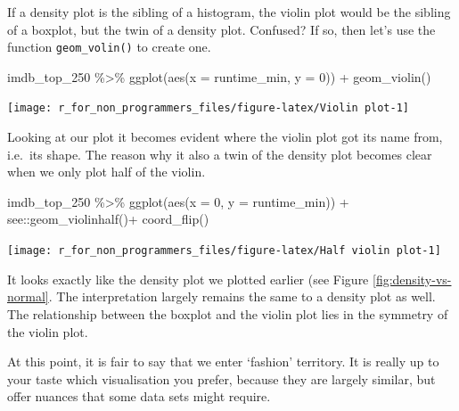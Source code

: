 \documentclass[
]{book}
\newenvironment{Shaded}{\begin{snugshade}}{\end{snugshade}}
\newcommand{\AttributeTok}[1]{\textcolor[rgb]{0.77,0.63,0.00}{#1}}
\newcommand{\DecValTok}[1]{\textcolor[rgb]{0.00,0.00,0.81}{#1}}
\newcommand{\FunctionTok}[1]{\textcolor[rgb]{0.00,0.00,0.00}{#1}}
\newcommand{\NormalTok}[1]{#1}
\newcommand{\SpecialCharTok}[1]{\textcolor[rgb]{0.00,0.00,0.00}{#1}}
\begin{document}
If a density plot is the sibling of a histogram, the violin plot would be the sibling of a boxplot, but the twin of a density plot. Confused? If so, then let's use the function \texttt{geom\_volin()} to create one.

\begin{Shaded}
\begin{Highlighting}[]
\NormalTok{imdb\_top\_250 }\SpecialCharTok{\%\textgreater{}\%}
  \FunctionTok{ggplot}\NormalTok{(}\FunctionTok{aes}\NormalTok{(}\AttributeTok{x =}\NormalTok{ runtime\_min, }\AttributeTok{y =} \DecValTok{0}\NormalTok{)) }\SpecialCharTok{+}
  \FunctionTok{geom\_violin}\NormalTok{()}
\end{Highlighting}
\end{Shaded}

\begin{center}\texttt{[image: r\_for\_non\_programmers\_files/figure-latex/Violin plot-1]} \end{center}

Looking at our plot it becomes evident where the violin plot got its name from, i.e.~its shape. The reason why it also a twin of the density plot becomes clear when we only plot half of the violin.

\begin{Shaded}
\begin{Highlighting}[]
\NormalTok{imdb\_top\_250 }\SpecialCharTok{\%\textgreater{}\%}
  \FunctionTok{ggplot}\NormalTok{(}\FunctionTok{aes}\NormalTok{(}\AttributeTok{x =} \DecValTok{0}\NormalTok{, }\AttributeTok{y =}\NormalTok{ runtime\_min)) }\SpecialCharTok{+}
\NormalTok{  see}\SpecialCharTok{::}\FunctionTok{geom\_violinhalf}\NormalTok{()}\SpecialCharTok{+}
  \FunctionTok{coord\_flip}\NormalTok{()}
\end{Highlighting}
\end{Shaded}

\begin{center}\texttt{[image: r\_for\_non\_programmers\_files/figure-latex/Half violin plot-1]} \end{center}

It looks exactly like the density plot we plotted earlier (see Figure \ref{fig:density-vs-normal}. The interpretation largely remains the same to a density plot as well. The relationship between the boxplot and the violin plot lies in the symmetry of the violin plot.

At this point, it is fair to say that we enter `fashion' territory. It is really up to your taste which visualisation you prefer, because they are largely similar, but offer nuances that some data sets might require.
\end{document}
